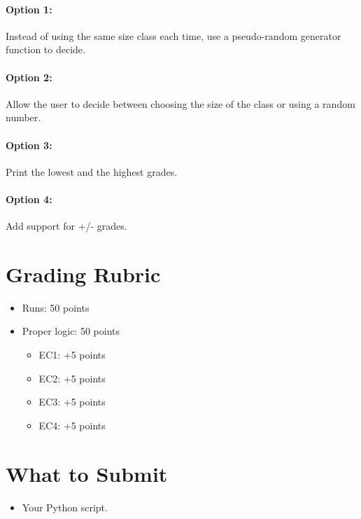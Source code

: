 \documentclass[letter,10pt]{article}
\begin{document}
    \paragraph{Option 1:}Instead of using the same size class each time, use a pseudo-random generator function to decide.
    
    \paragraph{Option 2:}Allow the user to decide between choosing the size of the class or using a random number.
    
    \paragraph{Option 3:}Print the lowest and the highest grades.
    
    \paragraph{Option 4:}Add support for +/- grades.
    
    \section*{Grading Rubric}
    \begin{itemize}
        \item Runs: 50 points
        \item Proper logic: 50 points
        \begin{itemize}
            \item EC1: +5 points
            \item EC2: +5 points
            \item EC3: +5 points
            \item EC4: +5 points
        \end{itemize}
    \end{itemize}
    
    \section*{What to Submit}
    \begin{itemize}
        \item Your Python script.
    \end{itemize}
\end{document}
